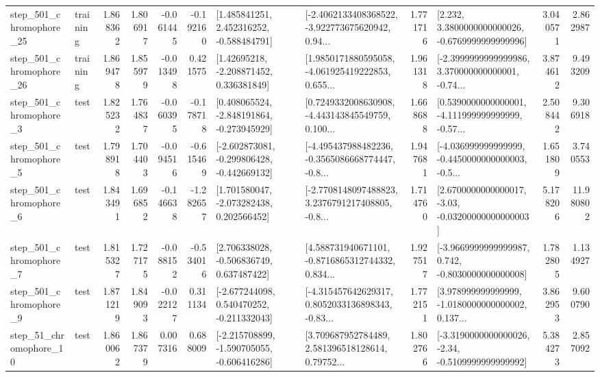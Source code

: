 \begin{tabular}{llrrrrllrlrr}
  step\_501\_chromophore\_25 &  training &      1.868362 &    1.806917 &     -0.061445 & -0.192160 &    [1.485841251, 2.452316252, -0.588484791] &  [-2.4062133408368522, -3.922773675620942, 0.94... &       1.771716 &   [2.232, 3.3800000000000026, -0.6769999999999996] &            3.040571 &          2.862987 \\
  step\_501\_chromophore\_26 &  training &      1.869478 &    1.855979 &     -0.013498 &  0.421575 &     [1.42695218, -2.208871452, 0.336381849] &  [1.9850171880595058, -4.061925419222853, 0.655... &       1.961318 &  [-2.3999999999999986, 3.370000000000001, -0.74... &            3.874612 &          9.493209 \\
   step\_501\_chromophore\_3 &      test &      1.825232 &    1.764837 &     -0.060395 & -0.178718 &   [0.408065524, -2.848191864, -0.273945929] &  [0.7249332008630908, -4.443143845549759, 0.100... &       1.668688 &  [0.5390000000000001, -4.111999999999999, -0.57... &            2.508442 &          9.306918 \\
   step\_501\_chromophore\_5 &      test &      1.798918 &    1.704403 &     -0.094516 & -0.615469 &  [-2.602873081, -0.299806428, -0.442669132] &  [-4.495437988482236, -0.3565086668774447, -0.8... &       1.947681 &  [-4.036999999999999, -0.4450000000000003, -0.5... &            1.651809 &          3.740553 \\
   step\_501\_chromophore\_6 &      test &      1.843491 &    1.696852 &     -0.146638 & -1.282657 &    [1.701580047, -2.073282438, 0.202566452] &  [-2.7708148097488823, 3.2376791217408805, -0.8... &       1.714760 &  [2.6700000000000017, -3.03, -0.03200000000000003] &            5.178206 &         11.980802 \\
   step\_501\_chromophore\_7 &      test &      1.815327 &    1.727175 &     -0.088152 & -0.534016 &    [2.706338028, -0.506836749, 0.637487422] &  [4.588731940671101, -0.8716865312744332, 0.834... &       1.927517 &  [-3.9669999999999987, 0.742, -0.8030000000000008] &            1.782805 &          1.134927 \\
   step\_501\_chromophore\_9 &      test &      1.871219 &    1.849093 &     -0.022127 &  0.311134 &   [-2.677244098, 0.540470252, -0.211332043] &  [-4.315457642629317, 0.8052033136898343, -0.83... &       1.772151 &  [3.978999999999999, -1.0180000000000002, 0.137... &            3.862953 &          9.600790 \\
   step\_51\_chromophore\_10 &      test &      1.860062 &    1.867379 &      0.007316 &  0.688009 &  [-2.215708899, -1.590705055, -0.606416286] &  [3.709687952784489, 2.581396518128614, 0.79752... &       1.802766 &  [-3.3190000000000026, -2.34, -0.5109999999999992] &            5.384273 &          2.857092 \\

\end{tabular}

